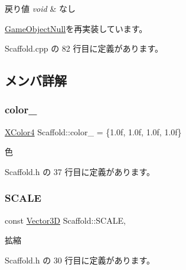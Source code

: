\begin{DoxyRetVals}{戻り値}
{\em void} & なし \\
\hline
\end{DoxyRetVals}


\mbox{\hyperlink{class_game_object_null_aeeb51b7e7aa41fd0b16f8f7c016bdb55}{Game\+Object\+Null}}を再実装しています。



 Scaffold.\+cpp の 82 行目に定義があります。



\subsection{メンバ詳解}
\mbox{\label{class_scaffold_ada7fa88a4cd38eb3a0fc73b7f6200259}} 
\subsubsection{\texorpdfstring{color\+\_\+}{color\_}}
{\footnotesize\ttfamily \mbox{\hyperlink{_vector3_d_8h_a680c30c4a07d86fe763c7e01169cd6cc}{X\+Color4}} Scaffold\+::color\+\_\+ = \{1.\+0f, 1.\+0f, 1.\+0f, 1.\+0f\}\hspace{0.3cm}{\ttfamily [private]}}



色 



 Scaffold.\+h の 37 行目に定義があります。

\mbox{\label{class_scaffold_a23fdba623ffbf08d9c7d082fa5951e45}} 
\subsubsection{\texorpdfstring{S\+C\+A\+LE}{SCALE}}
{\footnotesize\ttfamily const \mbox{\hyperlink{class_vector3_d}{Vector3D}} Scaffold\+::\+S\+C\+A\+LE\hspace{0.3cm}{\ttfamily [static]}, {\ttfamily [private]}}



拡縮 



 Scaffold.\+h の 30 行目に定義があります。

\mbox{\label{class_scaffold_a83570adc2d88e3047f70c070a82381bf}} 
